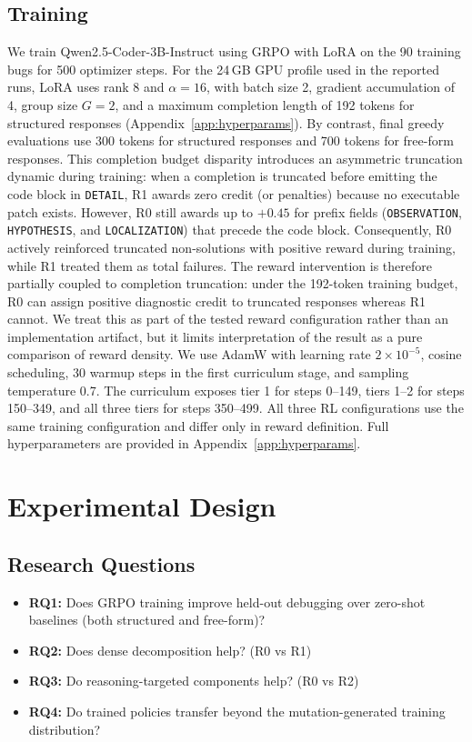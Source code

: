 \documentclass{article}
\begin{document}
\subsection{Training}
We train Qwen2.5-Coder-3B-Instruct using GRPO with LoRA on the 90 training bugs for 500 optimizer steps. For the 24\,GB GPU profile used in the reported runs, LoRA uses rank 8 and $\alpha=16$, with batch size 2, gradient accumulation of 4, group size $G=2$, and a maximum completion length of 192 tokens for structured responses (Appendix~\ref{app:hyperparams}). By contrast, final greedy evaluations use 300 tokens for structured responses and 700 tokens for free-form responses. This completion budget disparity introduces an asymmetric truncation dynamic during training: when a completion is truncated before emitting the code block in \texttt{DETAIL}, R1 awards zero credit (or penalties) because no executable patch exists. However, R0 still awards up to $+0.45$ for prefix fields (\texttt{OBSERVATION}, \texttt{HYPOTHESIS}, and \texttt{LOCALIZATION}) that precede the code block. Consequently, R0 actively reinforced truncated non-solutions with positive reward during training, while R1 treated them as total failures. The reward intervention is therefore partially coupled to completion truncation: under the 192-token training budget, R0 can assign positive diagnostic credit to truncated responses whereas R1 cannot. We treat this as part of the tested reward configuration rather than an implementation artifact, but it limits interpretation of the result as a pure comparison of reward density. We use AdamW with learning rate $2\times10^{-5}$, cosine scheduling, 30 warmup steps in the first curriculum stage, and sampling temperature 0.7. The curriculum exposes tier 1 for steps 0--149, tiers 1--2 for steps 150--349, and all three tiers for steps 350--499. All three RL configurations use the same training configuration and differ only in reward definition. Full hyperparameters are provided in Appendix~\ref{app:hyperparams}.

\section{Experimental Design}

\subsection{Research Questions}
\begin{itemize}
\item \textbf{RQ1:} Does GRPO training improve held-out debugging over zero-shot baselines (both structured and free-form)?
\item \textbf{RQ2:} Does dense decomposition help? (R0 vs R1)
\item \textbf{RQ3:} Do reasoning-targeted components help? (R0 vs R2)
\item \textbf{RQ4:} Do trained policies transfer beyond the mutation-generated training distribution?
\end{itemize}
\end{document}
